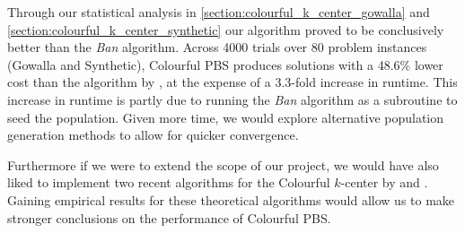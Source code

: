 Through our statistical analysis in \cref{section:colourful_k_center_gowalla} and \cref{section:colourful_k_center_synthetic} our algorithm proved to be conclusively better than the \emph{Ban} algorithm. Across 4000 trials over 80 problem instances (Gowalla and Synthetic), Colourful PBS produces solutions with a 48.6\% lower cost than the algorithm by \citeauthor{bandyapadhyay_constant_2019}, at the expense of a 3.3-fold increase in runtime. This increase in runtime is partly due to running the \emph{Ban} algorithm as a subroutine to seed the population. Given more time, we would explore alternative population generation methods to allow for quicker convergence.

Furthermore if we were to extend the scope of our project, we would have also liked to implement two recent algorithms for the Colourful $k$-center by \textcite{jia_fair_2020} and \textcite{anegg_technique_2020}. Gaining empirical results for these theoretical algorithms would allow us to make stronger conclusions on the performance of Colourful PBS.  